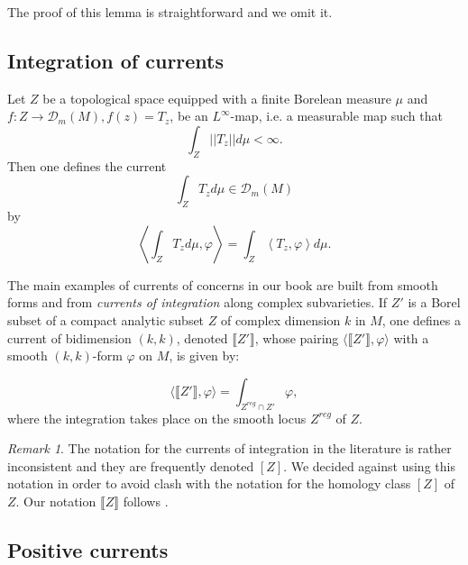 \documentclass[12pt]{amsbook}%
\theoremstyle{definition}
\theoremstyle{remark}
\newtheorem{rem}[thm]{Remark}
\numberwithin{section}{chapter}
\numberwithin{subsection}{section}
\numberwithin{figure}{chapter}
\def\cD{{\mathscr{D}}}
\begin{document}
{{The proof of this lemma is straightforward and we omit it. 

\subsection{Integration of currents} 

Let $Z$ be a topological space equipped with a finite Borelean measure $\mu$ and $f: Z\to  
\cD_m(M), f(z)=T_z$, be an $L^\infty$-map, i.e. a measurable map such that 
$$
\int_Z ||T_z||d\mu<\infty. 
$$ 
Then one defines the current  
$$
\int_Z T_zd\mu\in \cD_m(M)
$$
by 
\begin{equation}\label{eq:current integration} 
\left< \int_Z T_zd\mu, \varphi\right>=  \int_Z \left<  T_z, \varphi \right> d\mu. 
\end{equation}

The main examples of currents of concerns in our book are built from smooth forms and from \textit{currents of integration} along complex subvarieties. If $Z'$ is a Borel subset of a compact analytic subset $Z$ of complex dimension $k$ in $M$, one defines a current  of bidimension $(k,k)$, denoted $\llbracket Z'\rrbracket$, 
whose pairing $\langle \llbracket Z'\rrbracket, \varphi \rangle$ with a smooth $(k,k)$-form $\varphi$ on $M$, 
is given by: 

\begin{equation}
\langle \llbracket Z'\rrbracket, \varphi \rangle = \int_{Z^{reg}\cap Z'} \varphi,
\end{equation}
where the integration takes place on the smooth locus $Z^{reg}$ of $Z$. 


\begin{rem}
The notation for the currents of integration in the literature is rather inconsistent and they are frequently denoted $[Z]$. 
We decided against using this notation in order to avoid clash with the notation for the homology class $[Z]$ of $Z$. 
Our notation $\llbracket Z\rrbracket$ follows \cite{Simon}. 
\end{rem}

\subsection{Positive currents} \label{section_positive_currents}

}}
\end{document}
